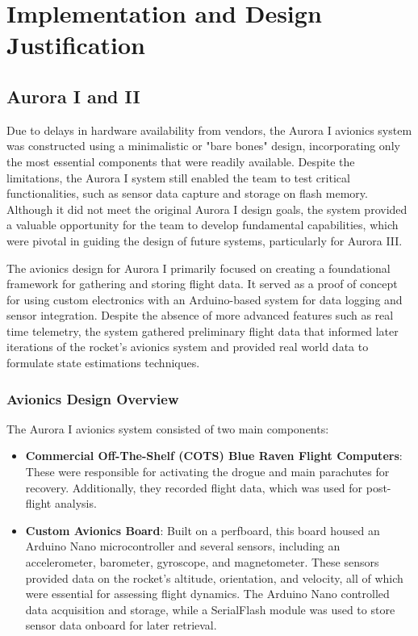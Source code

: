 \section{Implementation and Design Justification}
\subsection{Aurora I and II}
Due to delays in hardware availability from vendors, the Aurora I avionics system was constructed using a minimalistic or "bare bones" design, incorporating only the most essential components that were readily available. Despite the limitations, the Aurora I system still enabled the team to test critical functionalities, such as sensor data capture and storage on flash memory. Although it did not meet the original Aurora I design goals, the system provided a valuable opportunity for the team to develop fundamental capabilities, which were pivotal in guiding the design of future systems, particularly for Aurora III. 

The avionics design for Aurora I primarily focused on creating a foundational framework for gathering and storing flight data. It served as a proof of concept for using custom electronics with an Arduino-based system for data logging and sensor integration. Despite the absence of more advanced features such as real time telemetry, the system gathered preliminary flight data that informed later iterations of the rocket's avionics system and provided real world data to formulate state estimations techniques.  

\subsubsection{Avionics Design Overview}
The Aurora I avionics system consisted of two main components:

\begin{itemize}
    \item \textbf{Commercial Off-The-Shelf (COTS) Blue Raven Flight Computers}: These were responsible for activating the drogue and main parachutes for recovery. Additionally, they recorded flight data, which was used for post-flight analysis.
    \item \textbf{Custom Avionics Board}: Built on a perfboard, this board housed an Arduino Nano microcontroller and several sensors, including an accelerometer, barometer, gyroscope, and magnetometer. These sensors provided data on the rocket's altitude, orientation, and velocity, all of which were essential for assessing flight dynamics. The Arduino Nano controlled data acquisition and storage, while a SerialFlash module was used to store sensor data onboard for later retrieval.
\end{itemize}

